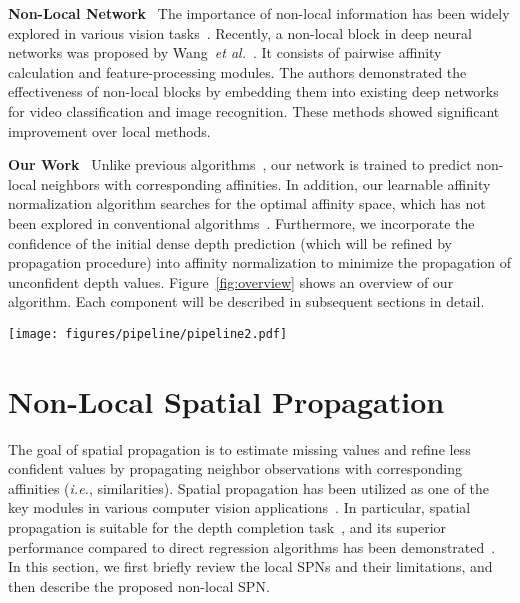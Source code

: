 \documentclass[runningheads]{llncs}
\newcommand{\Figref}[1]{Figure~\ref{#1}}
\newcommand{\etal}{\textit{et al.}}
\begin{document}
\noindent\textbf{Non-Local Network} \ 
The importance of non-local information has been widely explored in various vision tasks~\cite{buades2005non,wang2018non,yoon2006adaptive,shim2020robust}. 
Recently, a non-local block in deep neural networks was proposed by Wang~\etal~\cite{wang2018non}. 
It consists of pairwise affinity calculation and feature-processing modules. 
The authors demonstrated the effectiveness of non-local blocks by embedding them into existing deep networks for video classification and image recognition. 
These methods showed significant improvement over local methods.


\noindent\textbf{Our Work} \ 
Unlike previous algorithms~\cite{liu2017learning,cheng2018depth,xu2019depth}, our network is trained to predict non-local neighbors with corresponding affinities. 
In addition, our learnable affinity normalization algorithm searches for the optimal affinity space, which has not been explored in conventional algorithms~\cite{chen2016semantic,liu2017learning,cheng2018depth}. 
Furthermore, we incorporate the confidence of the initial dense depth prediction (which will be refined by propagation procedure) into affinity normalization to minimize the propagation of unconfident depth values. 
\Figref{fig:overview} shows an overview of our algorithm. 
Each component will be described in subsequent sections in detail.




\begin{figure*}[t]
\begin{center}
\texttt{[image: figures/pipeline/pipeline2.pdf]}
\caption{
\textbf{Overview of the proposed algorithm}. 
The encoder-decoder network is built upon the residual network~\cite{he2016deep}. Given RGB and sparse depth images, an initial dense depth and its confidence, non-local neighbors, and corresponding affinities are predicted from the network. Then non-local spatial propagation is conducted iteratively with the confidence-incorporated learnable affinity normalization.
}
\label{fig:overview}
\end{center}
\end{figure*}



\section{Non-Local Spatial Propagation}
\label{sec:sp}

The goal of spatial propagation is to estimate missing values and refine less confident values by propagating neighbor observations with corresponding affinities (\textit{i.e.}, similarities). 
Spatial propagation has been utilized as one of the key modules in various computer vision applications~\cite{perona1990scale,levin2006closed,krahenbuhl2011efficient}. 
In particular, spatial propagation is suitable for the depth completion task~\cite{liu2017learning,cheng2018depth,xu2019depth}, and its superior performance compared to direct regression algorithms has been demonstrated~\cite{uhrig2017sparsity,ma2018sparse}. 
In this section, we first briefly review the local SPNs and their limitations, and then describe the proposed non-local SPN.
\end{document}
